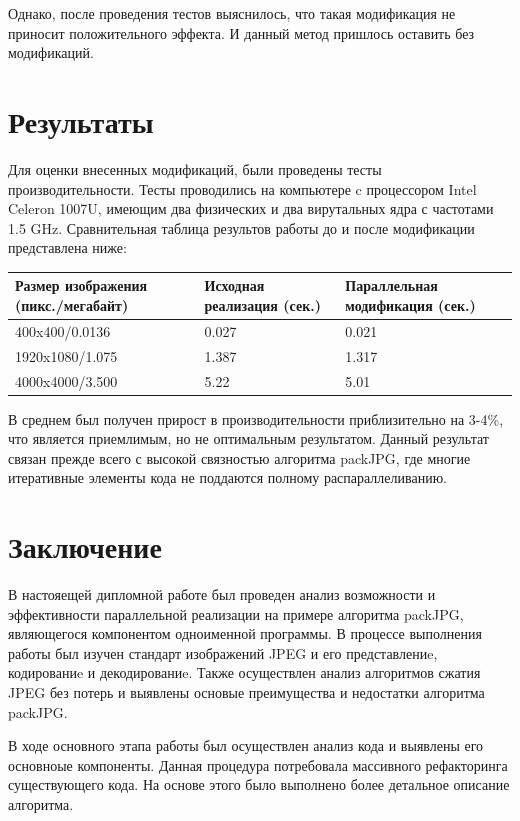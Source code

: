 \documentclass{matmex-diploma-custom}
\begin{document}
Однако, после проведения тестов выяснилось, что такая модификация не приносит положительного эффекта. И данный метод пришлось оставить без модификаций.

\section{Результаты}
Для оценки внесенных модификаций, были проведены тесты производительности. Тесты  проводились на компьютере c процессором Intel Celeron 1007U, имеющим два физических и два вирутальных ядра с частотами 1.5 GHz. Сравнительная таблица результов работы до и после модификации представлена ниже:


\begin{center}
    \begin{tabular}{ | p{5cm} | p{5cm} | p{5cm}|}
    \hline
    Размер изображения (пикс./мегабайт) & Исходная реализация (сек.) & Параллельная модификация (сек.) \\ \hline
    400x400/0.0136 & 0.027 & 0.021 \\ \hline
    1920x1080/1.075 & 1.387 & 1.317 \\ \hline
    4000x4000/3.500 & 5.22 & 5.01 \\
    \hline
    \end{tabular}
\end{center}


В среднем был получен прирост в производительности приблизительно на 3-4\%, что является приемлимым, но не оптимальным результатом. Данный результат связан прежде всего с высокой связностью алгоритма packJPG, где многие итеративные элементы кода не поддаются полному распараллеливанию.

\section*{Заключение}
В настояещей дипломной работе был проведен анализ возможности и эффективности параллельной реализации на примере алгоритма packJPG, являющегося компонентом одноименной программы.
В процессе выполнения работы был изучен стандарт изображений JPEG и его представлениe, кодированиe и декодированиe. Также осуществлен анализ алгоритмов сжатия JPEG без потерь и выявлены основые преимущества и недостатки алгоритма packJPG.


В ходе основного этапа работы был осуществлен анализ кода и выявлены  его основноые компоненты. Данная процедура потребовала массивного рефакторинга существующего кода. На основе этого было выполнено более детальное описание алгоритма.
\end{document}

